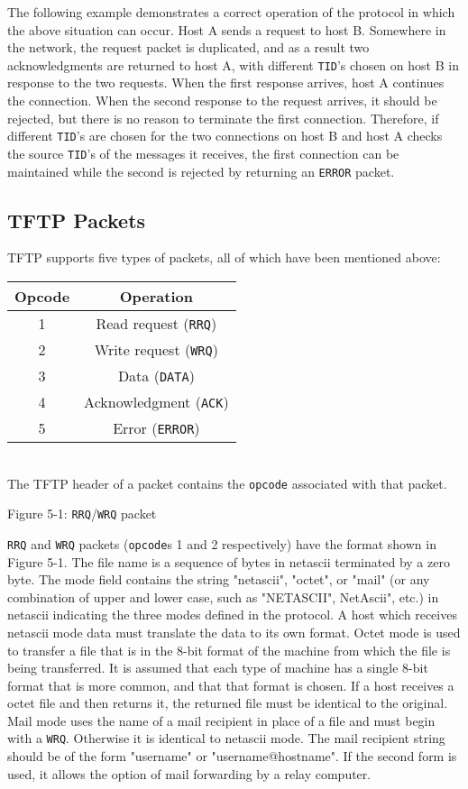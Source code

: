 \documentclass[12pt]{article}
\begin{document}
The following example demonstrates a correct operation of the protocol in which the above situation can occur. Host A sends a request to host B. Somewhere in the network, the request packet is duplicated, and as a result two acknowledgments are returned to host A, with different \verb|TID|'s chosen on host B in response to the two requests.  When the first response arrives, host A continues the connection. When the second response to the request arrives, it should be rejected, but there is no reason to terminate the first connection. Therefore, if different \verb|TID|'s are chosen for the two connections on host B and host A checks the source \verb|TID|'s of the messages it receives, the first connection can be maintained while the second is rejected by returning an   \verb|ERROR| packet.

\subsection{TFTP Packets}
TFTP supports five types of packets, all of which have been mentioned above:\\

\begin{tabular}{ |c|c| }
  \hline
  Opcode	&	Operation\\
  \hline
  1			&	Read request (\verb|RRQ|)\\
  \hline
  2		 	&	Write request (\verb|WRQ|)\\
  \hline
  3			&	Data (\verb|DATA|)\\
  \hline
  4			&	Acknowledgment (\verb|ACK|)\\
  \hline
  5		 	&	Error (\verb|ERROR|)\\
  \hline
  \end{tabular}\\

The TFTP header of a packet contains the \verb|opcode| associated with that packet.
\begin{center}
Figure 5-1: \verb|RRQ|/\verb|WRQ| packet
\end{center}

\verb|RRQ| and \verb|WRQ| packets (\verb|opcode|s 1 and 2 respectively) have the format shown in Figure 5-1. The file name is a sequence of bytes in netascii terminated by a zero byte. The mode field contains the string "netascii", "octet", or "mail" (or any combination of upper and lower case, such as "NETASCII", NetAscii", etc.) in netascii indicating the three modes defined in the protocol. A host which receives netascii mode data must translate the data to its own format.  Octet mode is used to transfer a file that is in the 8-bit format of the machine from which the file is being transferred. It is assumed that each type of machine has a single 8-bit format that is more common, and that that format is chosen. If a host receives a octet file and then returns it, the returned file must be identical to the original. Mail mode uses the name of a mail recipient in place of a file and must begin with a \verb|WRQ|. Otherwise it is identical to netascii mode. The mail recipient string should be of the form "username" or "username@hostname". If the second form is used, it allows the
option of mail forwarding by a relay computer.\\
\end{document}
